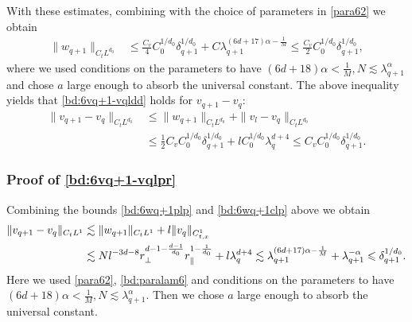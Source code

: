 \documentclass[UTF-8,reqno]{amsart}
\numberwithin{equation}{section}
\theoremstyle{definition}
\def\leq{\leqslant}
\def\leq{\leqslant}
\begin{document}
With these estimates, combining with the choice of parameters in  \eqref{para62}  we obtain 
\begin{align}
\|w_{q+1}\|_{C_tL^{d_0}}%
&\leq \frac{C_v}4C_0^{1/d_0}\delta_{q+1}^{1/d_0}+C\lambda_{q+1}^{(6d+17)\alpha-\frac1M} \leq \frac{C_v}2C_0^{1/d_0}\delta_{q+1}^{1/d_0},\label{bd:6wq+1l2}\end{align}
where we used  conditions on the parameters to have
${(6d+18)\alpha<\frac{1}{M}},N \lesssim\lambda_{q+1}^{\alpha}$ and chose $a$ large enough to absorb the universal constant. 
The above inequality   yields that \eqref{bd:6vq+1-vqldd} holds for $v_{q+1}-v_q$:
\begin{align*}
\|v_{q+1}-v_{q}\|_{C_tL^{d_0}}&\leq\|w_{q+1} \|_{C_tL^{d_0}}+\|v_{l}-v_{q}\|_{C_tL^{d_0}}\\
&\leq \frac12
C_vC_0^{1/d_0}\delta_{q+1}^{1/d_0}+lC_0^{1/d_0}\lambda_q^{d+4} \leq
C_vC_0^{1/d_0}\delta_{q+1}^{1/d_0}.
\end{align*}

\subsubsection{Proof of  \eqref{bd:6vq+1-vqlpr}}

Combining  the bounds  \eqref{bd:6wq+1plp} and \eqref{bd:6wq+1clp} above we obtain 
\begin{align*}
 \|v_{q+1}-v_q\|_{C_tL^{1}}&\lesssim  \|w_{q+1}\|_{C_tL^{1}} +l\|v_q\|_{C_{t,x}^1}\notag \\
&\lesssim  N l^{-3d-8}r_\perp^{d-1-\frac{d-1}{d_0}} r_\parallel^{1-\frac{1}{d_0}}+l \lambda_q^{d+4}\lesssim \lambda_{q+1}^{(6d+17)\alpha-\frac1M}+\lambda_{q+1}^{-\alpha}
\leq\delta_{q+1}^{1/d_0}. 
\end{align*}
  Here we used \eqref{para62}, \eqref{bd:paralam6} and  conditions on the parameters to have 
${(6d+18)\alpha<\frac{1}{M}},N \lesssim\lambda_{q+1}^{\alpha}$. Then we chose $a$ large enough to absorb the universal constant. 
\end{document}
